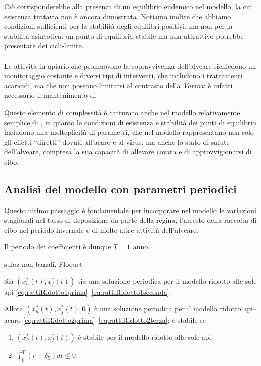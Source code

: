 Ciò corrisponderebbe alla presenza di un equilibrio endemico nel modello, la cui esistenza tuttavia non è ancora dimostrata.
Notiamo inoltre che abbiamo condizioni sufficienti per la stabilità degli equilibri positivi, ma non per la stabilità asintotica: un punto di equilibrio stabile ma non attrattivo potrebbe presentare dei cicli-limite.


\paragraph{}
Le attività in apiario che promuovono la sopravvivenza dell'alveare richiedono un monitoraggio costante e diversi tipi di interventi, che includono i trattamenti acaricidi, ma che non possono limitarsi al contrasto della \emph{Varroa}: è infatti necessario il mantenimento di 

Questo elemento di complessità è catturato anche nel modello relativamente semplice di \cite{ratti2017}, in quanto le condizioni di esistenza e stabilità dei punti di equilibrio includono una molteplicità di parametri, che nel modello rappresentano non solo gli effetti ``diretti'' dovuti all'acaro e al virus, ma anche lo stato di salute dell'alveare, compresa la sua capacità di allevare covata e di approvvigionarsi di cibo.


\subsection{Analisi del modello con parametri periodici}
\label{sez:paramPeriodici}
Questo ultimo passaggio è fondamentale per incorporare nel modello le variazioni stagionali nel tasso di deposizione da parte della regina, l'arresto della raccolta di cibo nel periodo invernale e di molte altre attività dell'alveare.

Il periodo dei coefficienti è dunque $T= 1 \text{ anno}$.

suloz non banali, Floquet

\begin{proposizione}
    Sia $\left( x_h^*(t), x_f^*(t) \right)$ sia una soluzione periodica per il modello ridotto alle sole api \eqref{eq:rattiRidotto1prima}--\eqref{eq:rattiRidotto1seconda}.

    Allora $\left( x_h^*(t), x_f^*(t), 0 \right)$ è una soluzione periodica per il modello ridotto api--acaro \eqref{eq:rattiRidotto2prima}--\eqref{eq:rattiRidotto2terza}; è stabile se
    \begin{enumerate}
        \item $\left( x_h^*(t), x_f^*(t) \right)$ è stabile per il modello ridotto alle sole api;
        \item $\int_0^T (r - \delta_5) dt \leq 0$.
    \end{enumerate}
\end{proposizione}


